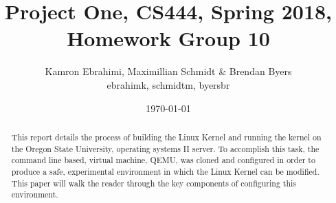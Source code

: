 \documentclass[10pt,onecolumn,draftclsnofoot]{IEEEtran} %
\title{ Project One, CS444, Spring 2018, Homework Group 10}
\author{Kamron Ebrahimi, Maximillian Schmidt \& Brendan Byers \\ ebrahimk, schmidtm, byersbr }
\date{\today}
\begin{document}
\begin{titlingpage}
\maketitle
\begin{abstract}
\begin{singlespace}
This report details the process of building the Linux Kernel and running the kernel on the Oregon State University, operating systems II server. To accomplish this task, the command line based, virtual machine, QEMU, was cloned and configured in order to produce a safe, experimental environment in which the Linux Kernel can be modified. This paper will walk the reader through the key components of configuring this environment.     %
\end{singlespace}
\end{abstract}
\end{titlingpage}


\tableofcontents
\end{document}

